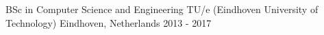 

\begin{cventries}

  \cventry
    {BSc in Computer Science and Engineering} %
    {TU/e (Eindhoven University of Technology)} %
    {Eindhoven, Netherlands} %
    {2013 - 2017} %
    {
    }

\end{cventries}

